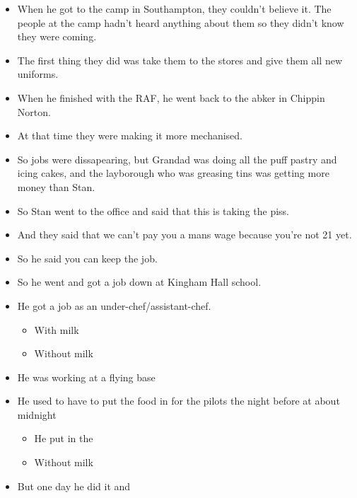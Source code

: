 \documentclass[10pt,twocolumn,letterpaper]{article}
\begin{document}
\begin{itemize}
    \item When he got to the camp in Southampton, they couldn't believe it. The people at the camp hadn't heard anything about them so they didn't know they were coming.
    \item The first thing they did was take them to the stores and give them all new uniforms.
    \item When he finished with the RAF, he went back to the abker in Chippin Norton.
    \item At that time they were making it more mechanised.
    \item So jobs were dissapearing, but Grandad was doing all the puff pastry and icing cakes, and the layborough who was greasing tins was getting more money than Stan.
    \item So Stan went to the office and said that this is taking the piss.
    \item And they said that we can't pay you a mans wage because you're not 21 yet.
    \item So he said you can keep the job.
    \item So he went and got a job down at Kingham Hall school.
    \item He got a job as an under-chef/assistant-chef.
          \begin{itemize}
              \item With milk
              \item Without milk
          \end{itemize}
    \item He was working at a flying base
    \item He used to have to put the food in for the pilots the night before at about midnight
          \begin{itemize}
              \item He put in the
              \item Without milk
          \end{itemize}
    \item But one day he did it and
\end{itemize}
\end{document}
